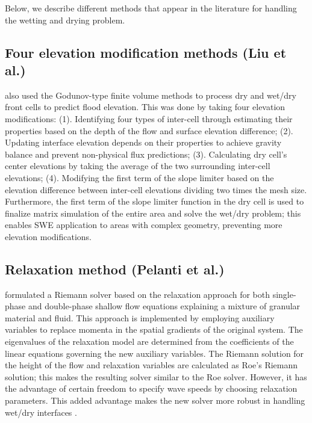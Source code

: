 \documentclass[10pt,a4paper]{article}
\begin{document}
	Below, we describe different methods that appear in the literature for handling the wetting and drying problem.
	
	\subsection{Four elevation modification  methods (Liu et al.)}
	\citet{li-ta-wa-ca-ba-ch-li:2021} also used the Godunov-type finite volume methods to process dry and wet/dry front cells to predict flood elevation. This was done by taking four elevation modifications: (1).  Identifying four types of inter-cell through estimating their properties based on the depth of the flow and surface elevation difference; (2). Updating interface elevation depends on their properties to achieve gravity balance and prevent non-physical flux predictions;  (3).  Calculating dry cell's center elevations by taking the average of the two surrounding inter-cell elevations; (4). Modifying the first term of the slope limiter based on the elevation difference between inter-cell elevations dividing two times the mesh size. Furthermore, the first term of the slope limiter function in the dry cell is used to finalize matrix simulation of the entire area and solve the wet/dry problem; this enables SWE application to areas with complex geometry, preventing more elevation modifications.
	
	\subsection{Relaxation method (Pelanti et al.)}
	
	\citet{pelanti2011riemann} formulated a Riemann solver based on the relaxation approach for both single-phase and double-phase shallow flow equations explaining a mixture of granular material and fluid. This approach is implemented by employing auxiliary variables to replace momenta in the spatial gradients of the original system. The eigenvalues of the relaxation model are determined from the coefficients of the linear equations governing the new auxiliary variables.  The Riemann solution for the height of the flow and relaxation variables are calculated as Roe's Riemann solution; this makes the resulting solver similar to the Roe solver. However, it has the advantage of certain freedom to specify wave speeds by choosing relaxation parameters. This added advantage makes the new solver more robust in handling wet/dry interfaces \citep{pelanti2008relaxation,pelanti2011riemann}.
	
\end{document}
